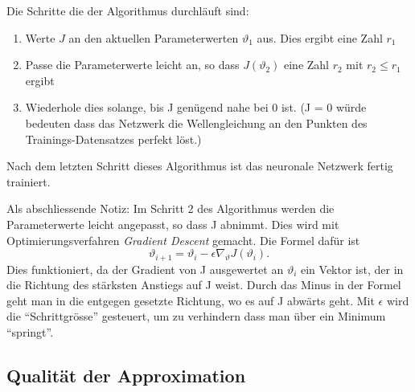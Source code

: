 Die Schritte die der Algorithmus durchläuft sind:
\begin{enumerate}
    \item Werte \( J \) an den aktuellen Parameterwerten \( \vartheta_1 \) aus. Dies ergibt eine Zahl \( r_1 \)
    \item Passe die Parameterwerte leicht an, so dass \( J(\vartheta_2) \) eine Zahl \( r_2 \) mit \( r_2 \leq r_1 \) ergibt
    \item Wiederhole dies solange, bis J genügend nahe bei 0 ist. (J = 0 würde bedeuten dass das Netzwerk die Wellengleichung an den Punkten des Trainings-Datensatzes perfekt löst.)
\end{enumerate}

Nach dem letzten Schritt dieses Algorithmus ist das neuronale Netzwerk fertig trainiert.

Als abschliessende Notiz: Im Schritt 2 des Algorithmus werden die Parameterwerte leicht angepasst, so dass J abnimmt.
Dies wird mit Optimierungsverfahren \emph{Gradient Descent} gemacht. Die Formel dafür ist
\begin{equation}
    \vartheta_{i+1} = \vartheta_i - \epsilon \nabla_\vartheta J\left(\vartheta_i\right).
\end{equation}
Dies funktioniert, da der Gradient von J ausgewertet an \( \vartheta_i \) ein Vektor ist, der in die Richtung des stärksten Anstiegs auf J weist.
Durch das Minus in der Formel geht man in die entgegen gesetzte Richtung, wo es auf J abwärts geht. 
Mit \( \epsilon \) wird die ``Schrittgrösse'' gesteuert, um zu verhindern dass man über ein Minimum ``springt''.


\subsection{Qualität der Approximation}\label{neuronal:subsection:qualität_nn}

